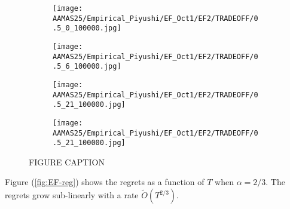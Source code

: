 \begin{figure*}
\centering
\begin{subfigure}{.3\textwidth}
    \centering
    \texttt{[image: AAMAS25/Empirical\_Piyushi/EF\_Oct1/EF2/TRADEOFF/0.5\_0\_100000.jpg]}  
    \caption{}
    \label{SUBFIGURE LABEL 2}
\end{subfigure}
\begin{subfigure}{.3\textwidth}
    \centering
    \texttt{[image: AAMAS25/Empirical\_Piyushi/EF\_Oct1/EF2/TRADEOFF/0.5\_6\_100000.jpg]}  
    \caption{}
    \label{SUBFIGURE LABEL 1}
\end{subfigure}
\begin{subfigure}{.3\textwidth}
    \centering
    \texttt{[image: AAMAS25/Empirical\_Piyushi/EF\_Oct1/EF2/TRADEOFF/0.5\_21\_100000.jpg]}  
    \caption{}
    \label{SUBFIGURE LABEL 3}
\end{subfigure}

\begin{subfigure}{.3\textwidth}
    \centering
    \texttt{[image: AAMAS25/Empirical\_Piyushi/EF\_Oct1/EF2/TRADEOFF/0.5\_21\_100000.jpg]}  
    \caption{}
    \label{SUBFIGURE LABEL 3}
\end{subfigure}
\caption{FIGURE CAPTION}
\label{FIGURE LABEL}
\end{figure*}

\iffalse 
\begin{figure*}[h!]
    \centering
    \texttt{[image: AAMAS25/Empirical\_Piyushi/EF\_Oct1/EF2/TRADEOFF/0.5\_0\_100000.jpg]}
    \texttt{[image: AAMAS25/Empirical\_Piyushi/EF\_Oct1/EF2/TRADEOFF/0.5\_6\_100000.jpg]}
        \texttt{[image: AAMAS25/Empirical\_Piyushi/EF\_Oct1/EF2/TRADEOFF/0.5\_21\_100000.jpg]}
    \caption{Explore-First for 2-arm case: The tradeoff between Social Welfare regret and Fairness regret is shown as a function of exploration parameter $\alpha$ (marked with different colors). $C_i$ is 0.5, and different plots correspond to different mean reward matrix $A$. The values reported are averaged across 100 runs with different random seeds. We can see that $\alpha=0.67$ obtains the optimal trade-off supporting our theoretical claim.}
    \label{fig:EF2}
\end{figure*}
\fi 

Figure (\ref{fig:EF-reg}) shows the regrets as a function of $T$ when $\alpha=2/3$. The regrets grow sub-linearly with a rate $\tilde{O}(T^{2/3})$.

